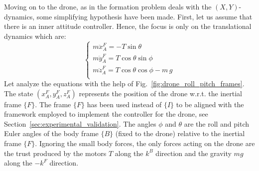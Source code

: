 \documentclass{ifacconf}
\begin{document}
Moving on to the drone, as in the formation problem deals with the $(X,Y)$-dynamics, some simplifying hypothesis have been made.
First, let us assume that there is an inner attitude controller.
Hence, the focus is only on the translational dynamics which are:
\begin{equation}
    \begin{cases}
        m\ddot{x}^F_A = - T \sin \theta \\
        m\ddot{y}^F_A = T \cos \theta \sin \phi \\
        m\ddot{z}^F_A = T \cos \theta \cos \phi  - m\, g\\
    \end{cases}
\end{equation}
Let analyze the equations with the help of Fig.~\ref{fig:drone_roll_pitch_frames}.
The state $({x}^F_A,{y}^F_A,{z}^F_A)$ represents the position of the drone w.r.t. the inertial frame $\{F\}$.
The frame $\{F\}$ has been used instead of $\{I\}$ to be aligned with the framework employed 
to implement the controller for the drone, see Section~\ref{sec:experimental_validation}.
The angles $\phi$ and $\theta$ are the roll and pitch Euler angles 
of the body frame $\{B\}$ (fixed to the drone) relative to the inertial
frame $\{F\}$.
Ignoring the small body forces, the only forces acting on the drone are 
the trust produced by the motors $T$ along the $k^B$ direction and 
the gravity $mg$ along the $-k^F$ direction.
\end{document}
